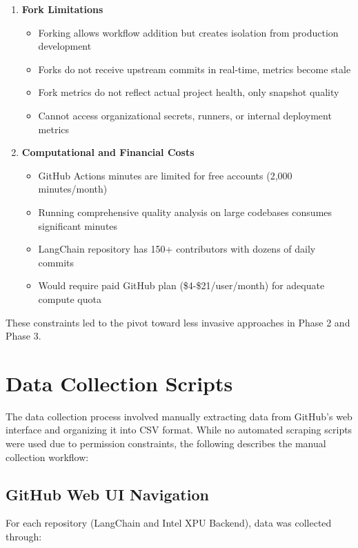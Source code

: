 \begin{enumerate}
    \item \textbf{Fork Limitations}
    \begin{itemize}
        \item Forking allows workflow addition but creates isolation from production development
        \item Forks do not receive upstream commits in real-time, metrics become stale
        \item Fork metrics do not reflect actual project health, only snapshot quality
        \item Cannot access organizational secrets, runners, or internal deployment metrics
    \end{itemize}

    \item \textbf{Computational and Financial Costs}
    \begin{itemize}
        \item GitHub Actions minutes are limited for free accounts (2,000 minutes/month)
        \item Running comprehensive quality analysis on large codebases consumes significant minutes
        \item LangChain repository has 150+ contributors with dozens of daily commits
        \item Would require paid GitHub plan (\$4-\$21/user/month) for adequate compute quota
    \end{itemize}
\end{enumerate}

These constraints led to the pivot toward less invasive approaches in Phase 2 and Phase 3.

\section{Data Collection Scripts}

The data collection process involved manually extracting data from GitHub's web interface and organizing it into CSV format. While no automated scraping scripts were used due to permission constraints, the following describes the manual collection workflow:

\subsection{GitHub Web UI Navigation}

For each repository (LangChain and Intel XPU Backend), data was collected through:

